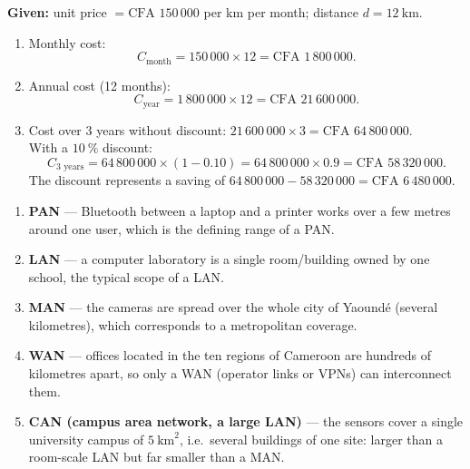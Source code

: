\documentclass[11pt]{article}
\begin{document}
\begin{corrige}
\textbf{Given:} unit price $= \text{CFA }150\,000$ per km per month; distance $d = 12\ \mathrm{km}$.
\begin{enumerate}
\item Monthly cost:
\[ C_{\text{month}} = 150\,000 \times 12 = \text{CFA }1\,800\,000. \]
\item Annual cost (12 months):
\[ C_{\text{year}} = 1\,800\,000 \times 12 = \text{CFA }21\,600\,000. \]
\item Cost over 3 years without discount: $21\,600\,000 \times 3 = \text{CFA }64\,800\,000$.\\
With a $10\ \%$ discount:
\[ C_{3\text{ years}} = 64\,800\,000 \times (1 - 0.10) = 64\,800\,000 \times 0.9 = \text{CFA }58\,320\,000. \]
The discount represents a saving of $64\,800\,000 - 58\,320\,000 = \text{CFA }6\,480\,000$.
\end{enumerate}
\end{corrige}

\begin{corrige}
\begin{enumerate}
\item \textbf{PAN} — Bluetooth between a laptop and a printer works over a few metres around one user, which is the defining range of a PAN.
\item \textbf{LAN} — a computer laboratory is a single room/building owned by one school, the typical scope of a LAN.
\item \textbf{MAN} — the cameras are spread over the whole city of Yaoundé (several kilometres), which corresponds to a metropolitan coverage.
\item \textbf{WAN} — offices located in the ten regions of Cameroon are hundreds of kilometres apart, so only a WAN (operator links or VPNs) can interconnect them.
\item \textbf{CAN (campus area network, a large LAN)} — the sensors cover a single university campus of $5\ \mathrm{km}^2$, i.e.\ several buildings of one site: larger than a room-scale LAN but far smaller than a MAN.
\end{enumerate}
\end{corrige}
\end{document}
